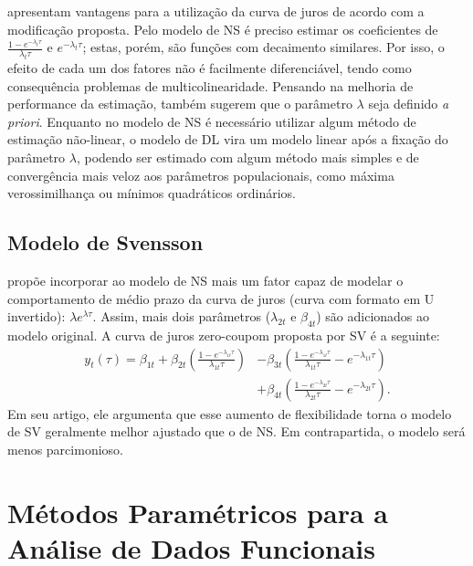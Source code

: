 \documentclass[
	12pt,				%
	openright,			%
	oneside,			%
	a4paper,			%
	english,			%
	brazil				%
	]{dissertacao-ufrgs-abntex2}
\begin{document}
 apresentam vantagens para a utilização da curva de juros
de acordo com a modificação proposta. Pelo modelo de NS é preciso estimar os coeficientes de $\frac{1-e^{-\lambda_{t}\tau}}{\lambda_{t}\tau}$
e $e^{-\lambda_{t}\tau}$; estas, porém, são funções com decaimento similares. Por isso,
o efeito de cada um dos fatores não é facilmente diferenciável,  tendo como consequência problemas de multicolinearidade. 
Pensando na melhoria de performance da estimação,  também sugerem que o parâmetro $\lambda$ seja definido \emph{a priori}. Enquanto no modelo de NS é necessário utilizar algum método de estimação não-linear, o modelo de DL vira um modelo linear após a fixação do parâmetro $\lambda$, podendo ser estimado com algum método mais simples e de convergência mais veloz aos parâmetros populacionais, como máxima verossimilhança ou mínimos quadráticos ordinários.

\subsection{Modelo de Svensson}

 propõe incorporar ao modelo de NS mais um fator capaz
de modelar o comportamento de médio prazo da curva de juros (curva
com formato em U invertido): $\lambda e^{\lambda\tau}$. Assim, mais dois parâmetros
($\lambda_{2t}$ e $\beta_{4t}$) são adicionados ao modelo original.
A curva de juros zero-coupom proposta por SV é a seguinte:
\begin{equation}
\begin{split}
y_{t}(\tau)=\beta_{1t}+\beta_{2t}\left(\frac{1-e^{-\lambda_{1t}\tau}}{\lambda_{1t}\tau}\right) & -\beta_{3t} \left(\frac{1-e^{-\lambda_{1t}\tau}}{\lambda_{1t}\tau}-e^{-\lambda_{1t}\tau}\right) \\ &
+\beta_{4t}\left(\frac{1-e^{-\lambda_{2t}\tau}}{\lambda_{2t}\tau} - e^{-\lambda_{2t}\tau}\right).
\end{split}
\end{equation}
Em seu artigo, ele argumenta que esse aumento de flexibilidade torna o modelo de SV
geralmente melhor ajustado que o de NS. Em contrapartida, o modelo será menos
parcimonioso.

\section{Métodos Paramétricos para a Análise de Dados Funcionais\label{sec:Metodologias-para-modelos}}
\end{document}

